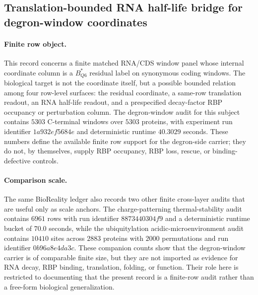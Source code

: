 
\subsection{Translation-bounded RNA half-life bridge for degron-window coordinates}
\label{sec:bioreality-q6-rna-decay-rbp-bridge-degron-voutsinos}

\paragraph{Finite row object.}
This record concerns a finite matched RNA/CDS window panel whose internal coordinate column is a $B^*_{Q6}$ residual label on synonymous coding windows.  The biological target is not the coordinate itself, but a possible bounded relation among four row-level surfaces: the residual coordinate, a same-row translation readout, an RNA half-life readout, and a prespecified decay-factor RBP occupancy or perturbation column.  The degron-window audit for this subject contains $5303$ C-terminal windows over $5303$ proteins, with experiment run identifier $1a932ef5684e$ and deterministic runtime $40.3029$ seconds.  These numbers define the available finite row support for the degron-side carrier; they do not, by themselves, supply RBP occupancy, RBP loss, rescue, or binding-defective controls.

\paragraph{Comparison scale.}
The same BioReality ledger also records two other finite cross-layer audits that are useful only as scale anchors.  The charge-patterning thermal-stability audit contains $6961$ rows with run identifier $8873440304f9$ and a deterministic runtime bucket of $70.0$ seconds, while the ubiquitylation acidic-microenvironment audit contains $10410$ sites across $2883$ proteins with $2000$ permutations and run identifier $0b96a8e4da3c$.  These companion counts show that the degron-window carrier is of comparable finite size, but they are not imported as evidence for RNA decay, RBP binding, translation, folding, or function.  Their role here is restricted to documenting that the present record is a finite-row audit rather than a free-form biological generalization.

